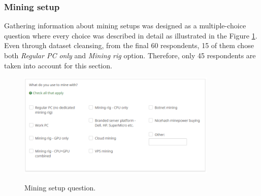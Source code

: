 \documentclass[
  printed, %
  table,   %
  lof,     %
  lot,     %
           oneside, color
]{fithesis3}
\begin{document}
\subsubsection{Mining setup}
Gathering information about mining setups was designed as a multiple-choice question where every choice was described in detail as illustrated in the Figure \ref{pic:miningquestion}. Even through dataset cleansing, from the final 60 respondents, 15 of them chose both \textit{Regular PC only} and \textit{Mining rig} option. Therefore, only 45 respondents are taken into account for this section.
\begin{figure}[H]
\begin{center}

    \vspace{-1em}
 \includegraphics[trim={0.5cm 1.7cm 0.5cm 0.5cm},clip,width=0.85\textwidth]{Screenshot_31.png}
    \caption{Mining setup question.}
    \vspace{-1.5em}
    \label{pic:miningquestion}
\end{center}
    \end{figure}
    
\end{document}
